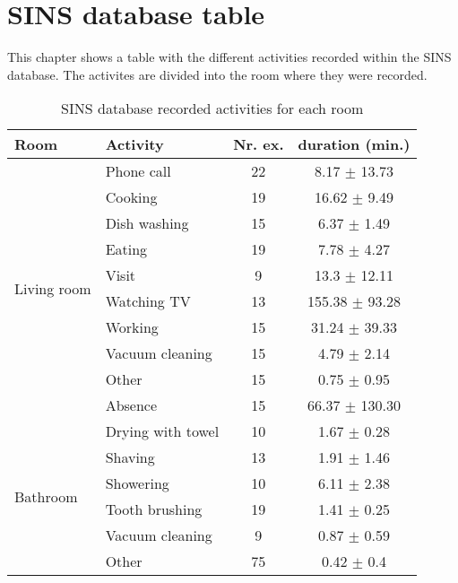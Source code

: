 \chapter{SINS database table}
\label{app:SINS-Databse-Table}
This chapter shows a table with the different activities recorded within the SINS database. The activites are divided into the room where they were recorded.

\begin{table}[htbp]
    \centering
    \caption[SINS database recorded activities for each room]{SINS database recorded activities for each room \footnotemark}
	\label{tab:sins-database-recorded-activities}
    \begin{tabular}{l|l|c|c}
        \toprule
        \textbf{Room} & \textbf{Activity} & \textbf{Nr. ex.} & \textbf{duration (min.)} \\ 
        \midrule[1pt]
        \multirow{10}{*}{Living room} & Phone call & 22 & 8.17 $\pm$ 13.73 \\
        \cline{2-4}
        & Cooking & 19 & 16.62 $\pm$ 9.49 \\
        \cline{2-4}
        & Dish washing & 15 & 6.37 $\pm$ 1.49 \\
        \cline{2-4}
        & Eating & 19 & 7.78 $\pm$ 4.27 \\
        \cline{2-4}
        & Visit & 9 & 13.3 $\pm$ 12.11 \\
        \cline{2-4}
        & Watching TV & 13 & 155.38 $\pm$ 93.28 \\
        \cline{2-4}
        & Working & 15 & 31.24 $\pm$ 39.33 \\
        \cline{2-4}
        & Vacuum cleaning & 15 & 4.79 $\pm$ 2.14 \\
        \cline{2-4}
        & Other & 15 & 0.75 $\pm$ 0.95 \\
        \cline{2-4}
        & Absence & 15 & 66.37 $\pm$ 130.30 \\
        \midrule[1pt]
        \multirow{7}{*}{Bathroom} & Drying with towel & 10 & 1.67 $\pm$ 0.28 \\
        \cline{2-4}
        & Shaving & 13 & 1.91 $\pm$ 1.46 \\
        \cline{2-4}
        & Showering & 10 & 6.11 $\pm$ 2.38 \\
        \cline{2-4}
        & Tooth brushing & 19 & 1.41 $\pm$ 0.25 \\
        \cline{2-4}
        & Vacuum cleaning & 9 & 0.87 $\pm$ 0.59 \\
        \cline{2-4}
        & Other & 75 & 0.42 $\pm$ 0.4 \\

\end{tabular}
\end{table}
